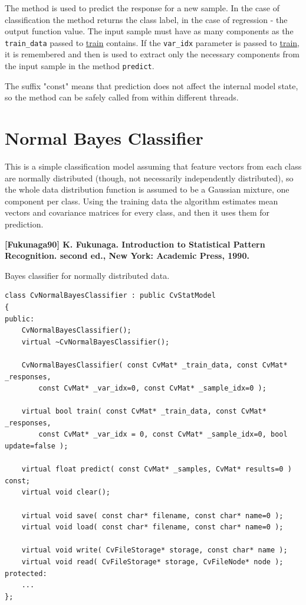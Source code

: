 
The method is used to predict the response for a new sample. In the case of classification the method returns the class label, in the case of regression - the output function value. The input sample must have as many components as the \texttt{train\_data} passed to \href{#CvStatModel_train}{train} contains. If the \texttt{var\_idx} parameter is passed to \href{#CvStatModel_train}{train}, it is remembered and then is used to extract only the necessary components from the input sample in the method \texttt{predict}.

The suffix "const" means that prediction does not affect the internal model state, so the method can be safely called from within different threads.

\section{Normal Bayes Classifier}

This is a simple classification model assuming that feature vectors from each class are normally distributed (though, not necessarily independently distributed), so the whole data distribution function is assumed to be a Gaussian mixture, one component per  class. Using the training data the algorithm estimates mean vectors and covariance matrices for every class, and then it uses them for prediction.

\textbf{[Fukunaga90] K. Fukunaga. Introduction to Statistical Pattern Recognition. second ed., New York: Academic Press, 1990.}



Bayes classifier for normally distributed data.

\begin{lstlisting}
class CvNormalBayesClassifier : public CvStatModel
{
public:
    CvNormalBayesClassifier();
    virtual ~CvNormalBayesClassifier();

    CvNormalBayesClassifier( const CvMat* _train_data, const CvMat* _responses,
        const CvMat* _var_idx=0, const CvMat* _sample_idx=0 );

    virtual bool train( const CvMat* _train_data, const CvMat* _responses,
        const CvMat* _var_idx = 0, const CvMat* _sample_idx=0, bool update=false );

    virtual float predict( const CvMat* _samples, CvMat* results=0 ) const;
    virtual void clear();

    virtual void save( const char* filename, const char* name=0 );
    virtual void load( const char* filename, const char* name=0 );

    virtual void write( CvFileStorage* storage, const char* name );
    virtual void read( CvFileStorage* storage, CvFileNode* node );
protected:
    ...
};
\end{lstlisting}



